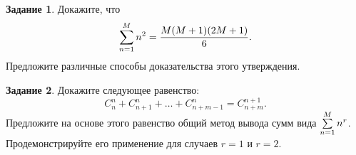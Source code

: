 \documentclass{book}
\numberwithin{theorem}{chapter}
\numberwithin{statement}{chapter}
\numberwithin{lemma}{chapter}
\theoremstyle{definition}
\newtheorem{task}{Задание}
\numberwithin{task}{chapter}
\theoremstyle{remark}
\numberwithin{example}{chapter}
\theoremstyle{definition}
\numberwithin{definition}{chapter}
\theoremstyle{remark}
\theoremstyle{remark}
\numberwithin{lyrics}{section}
\begin{document}
\begin{task} Докажите, что 
	\begin{equation}
	\sum\limits_{n=1}^M n^2 = \frac{M(M + 1)(2M + 1)}{6}.
	\end{equation}
	Предложите различные способы доказательства этого утверждения.
\end{task}

\begin{task} Докажите следующее равенство:
	\begin{equation}
	C^n_n + C^n_{n + 1} + \dots + C^n_{n + m - 1} = C^{n + 1}_{n + m}.
	\end{equation}
	Предложите на основе этого равенство общий метод вывода сумм вида $\sum\limits_{n = 1}^M n^r$. Продемонстрируйте его применение для случаев $r = 1$ и $r = 2$.
\end{task}
\end{document}
